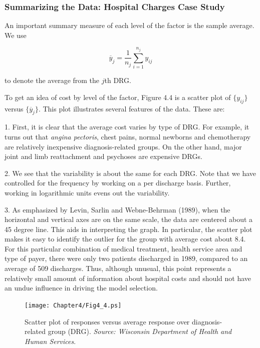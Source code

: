 \subsubsection*{Summarizing the Data: Hospital Charges Case Study}

An important summary measure of each level of the factor is the sample
average. We use

\begin{equation*}
\overline{y}_{j}=\frac{1}{n_{j}}\sum_{i=1}^{n_{j}}y_{ij}
\end{equation*}

\noindent to denote the average from the $j$th DRG.

To get an idea of cost by level of the factor, Figure 4.4 is a
scatter plot of $\{y_{ij}\}$ versus $\{\overline{y}_{j}\}$. This
plot illustrates several features of the data. These are:

1. First, it is clear that the average cost varies by type of DRG. For
example, it turns out that \textit{angina pectoris}, chest pains, normal
newborns and chemotherapy are relatively inexpensive diagnosis-related
groups. On the other hand, major joint and limb reattachment and psychoses
are expensive DRGs.

2. We see that the variability is about the same for each DRG. Note
that we have controlled for the frequency by working on a per
discharge basis. Further, working in logarithmic units evens out the
variability.

3. As emphasized by Levin, Sarlin and Webne-Behrman (1989), when the
horizontal and vertical axes are on the same scale, the data are
centered about a 45 degree line. This aids in interpreting the
graph. In particular, the scatter plot makes it easy to identify the
outlier for the group with average cost about 8.4. For this
particular combination of medical treatment, health service area and
type of payer, there were only two patients discharged in 1989,
compared to an average of 509 discharges. Thus, although unusual,
this point represents a relatively small amount of information about
hospital costs and should not have an undue influence in driving the
model selection.

\linejed

\begin{figure}[htp]
  \begin{center}
    \texttt{[image: Chapter4/Fig4\_4.ps]}
    \caption{\label{F4:DRGObsFits} \small  Scatter plot of responses versus average response over diagnosis-related
group (DRG). \textit{Source: Wisconsin Department of Health and
Human Services}.}
  \end{center}
\end{figure}



